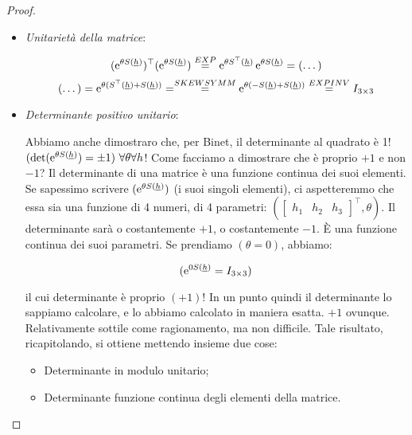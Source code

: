 \begin{proof}


\begin{itemize}

\item{\textit{Unitarietà della matrice}}:

\[
	(\mathop{}\!\mathrm{e}^{\theta S(\underline{h})})^\top(\mathop{}\!\mathrm{e}^{\theta S(\underline{h})}) \stackrel{EXP}{=} \mathop{}\!\mathrm{e}^{\theta S^\top(\underline{h})}\mathop{}\!\mathrm{e}^{\theta S(\underline{h})} = (\dots)
\]
\[
	(\dots) = \mathop{}\!\mathrm{e}^{\theta (S^\top(\underline{h}) + S(\underline{h}))} = \stackrel{SKEWSYMM}{=} \mathop{}\!\mathrm{e}^{\theta(-S(\underline{h})+S(\underline{h}))} \stackrel{EXPINV}{=} I_{3\times 3}
\]

\item{\textit{Determinante positivo unitario}}:

Abbiamo anche dimostraro che, per Binet, il determinante al quadrato è 1! $(\det(\mathop{}\!\mathrm{e}^{\theta S(\underline{h})}) = \pm 1)\ \forall\theta\forall h$! Come facciamo a dimostrare che è proprio $+1$ e non $-1$? Il determinante di una matrice è una funzione continua dei suoi elementi. Se sapessimo scrivere $(\mathop{}\!\mathrm{e}^{\theta S(\underline{h})})$ (i suoi singoli elementi), ci aspetteremmo che essa sia una funzione di 4 numeri, di 4 parametri: $(\begin{bmatrix}h_1&h_2&h_3\end{bmatrix}^\top, \theta)$. Il determinante sarà o costantemente $+1$, o costantemente $-1$. \`E una funzione continua dei suoi parametri. Se prendiamo $(\theta=0)$, abbiamo:

\[
	(\mathop{}\!\mathrm{e}^{0S(\underline{h})} = I_{3\times 3})
\]

il cui determinante è proprio $(+1)$! In un punto quindi il determinante lo sappiamo calcolare, e lo abbiamo calcolato in maniera esatta. $+1$ ovunque. Relativamente sottile come ragionamento, ma non difficile. Tale risultato, ricapitolando, si ottiene mettendo insieme due cose:

\begin{itemize}

\item Determinante in modulo unitario;
\item Determinante funzione continua degli elementi della matrice.

\end{itemize}

\end{itemize}

\end{proof}

